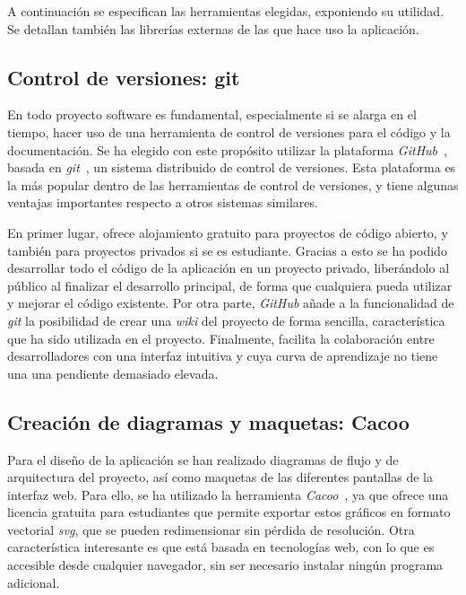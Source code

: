 A continuación se especifican las herramientas elegidas, exponiendo su utilidad.
Se detallan también las librerías externas de las que hace uso la aplicación.

\subsection*{Control de versiones: git\label{ssec:dp:git}}

En todo proyecto software es fundamental, especialmente si se alarga en el tiempo, hacer uso de una herramienta de control de versiones para el código y la documentación. Se ha elegido con este propósito utilizar la plataforma \textit{GitHub}~\cite{github}, basada en \textit{git}~\cite{git}, un sistema distribuido de control de versiones.
Esta plataforma es la más popular dentro de las herramientas de control de versiones, y tiene algunas ventajas importantes respecto a otros sistemas similares.

En primer lugar, ofrece alojamiento gratuito para proyectos de código abierto, y también para proyectos privados si se es estudiante. Gracias a esto se ha podido desarrollar todo el código de la aplicación en un proyecto privado, liberándolo al público al finalizar el desarrollo principal, de forma que cualquiera pueda utilizar y mejorar el código existente.
Por otra parte, \textit{GitHub} añade a la funcionalidad de \textit{git} la posibilidad de crear una \textit{wiki} del proyecto de forma sencilla, característica que ha sido utilizada en el proyecto.
Finalmente, facilita la colaboración entre desarrolladores con una interfaz intuitiva y cuya curva de aprendizaje no tiene una una pendiente demasiado elevada.

\subsection*{Creación de diagramas y maquetas: Cacoo\label{ssec:dp:cacoo}}

Para el diseño de la aplicación se han realizado diagramas de flujo y de arquitectura del proyecto, así como maquetas de las diferentes pantallas de la interfaz web.
Para ello, se ha utilizado la herramienta \textit{Cacoo}~\cite{cacoo}, ya que ofrece una licencia gratuita para estudiantes que permite exportar estos gráficos en formato vectorial \textit{svg}, que se pueden redimensionar sin pérdida de resolución.
Otra característica interesante es que está basada en tecnologías web, con lo que es accesible desde cualquier navegador, sin ser necesario instalar ningún programa adicional.

